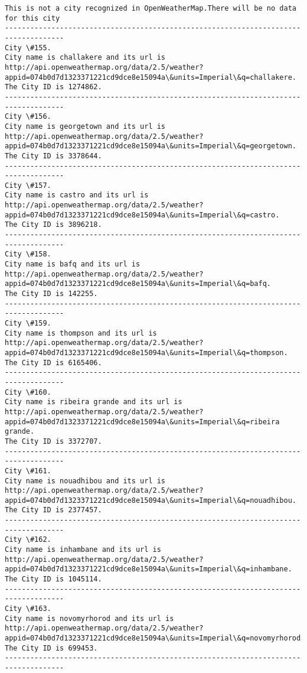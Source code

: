\documentclass[11pt]{article}
\begin{document}
\begin{Verbatim}[commandchars=\\\{\}]
This is not a city recognized in OpenWeatherMap.There will be no data for this city
------------------------------------------------------------------------------------
City \#155.
City name is challakere and its url is http://api.openweathermap.org/data/2.5/weather?appid=074b0d7d1323371221cd9dce8e15094a\&units=Imperial\&q=challakere.
The City ID is 1274862.
------------------------------------------------------------------------------------
City \#156.
City name is georgetown and its url is http://api.openweathermap.org/data/2.5/weather?appid=074b0d7d1323371221cd9dce8e15094a\&units=Imperial\&q=georgetown.
The City ID is 3378644.
------------------------------------------------------------------------------------
City \#157.
City name is castro and its url is http://api.openweathermap.org/data/2.5/weather?appid=074b0d7d1323371221cd9dce8e15094a\&units=Imperial\&q=castro.
The City ID is 3896218.
------------------------------------------------------------------------------------
City \#158.
City name is bafq and its url is http://api.openweathermap.org/data/2.5/weather?appid=074b0d7d1323371221cd9dce8e15094a\&units=Imperial\&q=bafq.
The City ID is 142255.
------------------------------------------------------------------------------------
City \#159.
City name is thompson and its url is http://api.openweathermap.org/data/2.5/weather?appid=074b0d7d1323371221cd9dce8e15094a\&units=Imperial\&q=thompson.
The City ID is 6165406.
------------------------------------------------------------------------------------
City \#160.
City name is ribeira grande and its url is http://api.openweathermap.org/data/2.5/weather?appid=074b0d7d1323371221cd9dce8e15094a\&units=Imperial\&q=ribeira grande.
The City ID is 3372707.
------------------------------------------------------------------------------------
City \#161.
City name is nouadhibou and its url is http://api.openweathermap.org/data/2.5/weather?appid=074b0d7d1323371221cd9dce8e15094a\&units=Imperial\&q=nouadhibou.
The City ID is 2377457.
------------------------------------------------------------------------------------
City \#162.
City name is inhambane and its url is http://api.openweathermap.org/data/2.5/weather?appid=074b0d7d1323371221cd9dce8e15094a\&units=Imperial\&q=inhambane.
The City ID is 1045114.
------------------------------------------------------------------------------------
City \#163.
City name is novomyrhorod and its url is http://api.openweathermap.org/data/2.5/weather?appid=074b0d7d1323371221cd9dce8e15094a\&units=Imperial\&q=novomyrhorod.
The City ID is 699453.
------------------------------------------------------------------------------------

\end{Verbatim}
\end{document}
